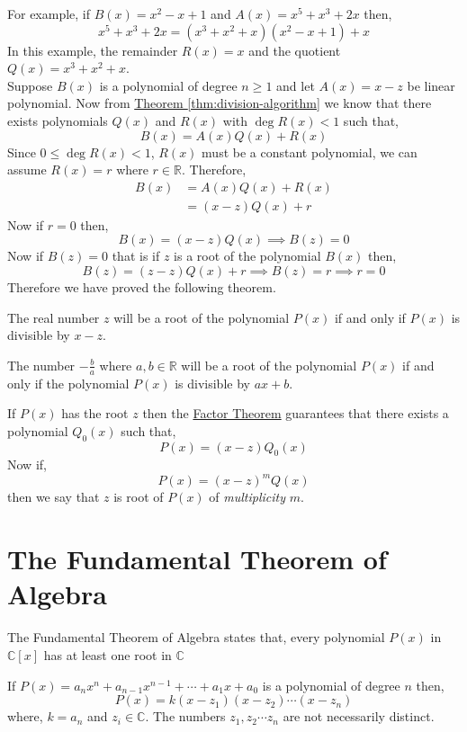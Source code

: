 \documentclass[11pt,numbers=noenddot,svgnames]{scrbook}
\DeclareMathOperator{\Deg}{deg}
\begin{document}
For example, if $B(x)= x^{2}-x+1$ and $A(x)=x^{5}+x^{3}+2x$ then,
\[
    x^{5}+x^{3}+2x = \left(x^{3}+x^{2}+x\right) \left(x^{2}-x+1\right) +x
\]
In this example, the remainder $R(x)=x$ and the quotient $Q(x)=x^{3}+x^{2}+x$. \\
Suppose $B(x)$ is a polynomial of degree $n\geq 1$ and let $A(x)=x-z$ be linear polynomial. Now from 
\hyperref[thm:division-algorithm]{Theorem \ref{thm:division-algorithm}} we know that there exists polynomials 
$Q(x)$ and $R(x)$ with $\Deg R(x) < 1$ such that,
\[
    B(x) = A(x)Q(x) + R(x)
\]
Since $0 \leq \Deg R(x) < 1$, $R(x)$ must be a constant polynomial, we can assume $R(x)=r$ where $r \in \mathbb{R}$. 
Therefore,
\begin{align*}
    B(x) &= A(x)Q(x) + R(x) \\
         &= (x - z)Q(x) + r
\end{align*}
Now if $r=0$ then,
\[
    B(x) = (x-z)Q(x) \implies B\left(z\right) = 0
\]
Now if $B\left(z\right)=0$ that is if $z$ is a root of the polynomial $B(x)$ then,
\[
    B\left(z\right) = \left(z - z\right)Q(x) + r \implies B\left(z\right)=r \implies 
    r=0
\]
Therefore we have proved the following theorem.
\begin{theorem}\label{thm:factor-theorem}
    The real number $z$ will be a root of the polynomial $P(x)$ if and only if $P(x)$ is divisible by $x-z$.
\end{theorem}
\begin{corollary}
    The number $-\frac{b}{a}$ where $a, b\in \mathbb{R}$ will be a root of the polynomial $P(x)$ if and only if the 
    polynomial $P(x)$ is divisible by $ax+b$.
\end{corollary}
If $P(x)$ has the root $z$ then the \hyperref[thm:factor-theorem]{Factor Theorem} guarantees that there exists a polynomial 
$Q_{0}(x)$ such that,
\[
    P(x) = \left(x - z\right)Q_{0}(x)
\]
Now if,
\[
    P(x) = \left(x-z\right)^{m}Q(x)
\]
then we say that $z$ is root of $P(x)$ of \textit{multiplicity} $m$.

\section{The Fundamental Theorem of Algebra}

\begin{theorem}\label{thm:fta}
    The Fundamental Theorem of Algebra states that, every polynomial $P(x)$ in $\mathbb{C}[x]$ has at least 
    one root in $\mathbb{C}$
\end{theorem}
\begin{corollary}
    If $P(x) = a_{n}x^{n} + a_{n-1}x^{n-1} + \cdots + a_{1}x + a_{0}$ is a polynomial of degree $n$ then,
    \[
        P(x) = k(x - z_{1})(x - z_{2})\cdots (x - z_{n})
    \]
    where, $k = a_{n}$ and $z_{i} \in \mathbb{C}$. The numbers $z_{1},z_{2}\cdots z_{n}$ are not necessarily 
    distinct.
\end{corollary}
\end{document}
